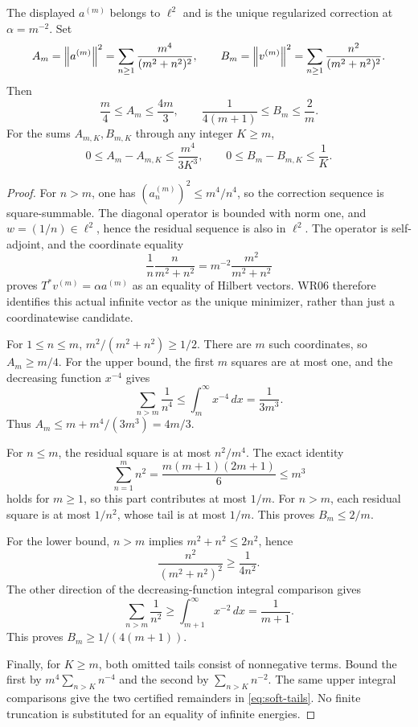 \begin{proposition}\label{WR10}
The displayed $a^{(m)}$ belongs to $\ell^2$ and is the unique regularized correction at $\alpha=m^{-2}$. Set
\[
 A_m=\left\lVert a^{(m)}\right\rVert^2=\sum_{n\ge1}\frac{m^4}{(m^2+n^2)^2},\qquad
 B_m=\left\lVert v^{(m)}\right\rVert^2=\sum_{n\ge1}\frac{n^2}{(m^2+n^2)^2}.
\]
Then
\begin{equation}\label{eq:soft-bounds}
 \frac m4\le A_m\le\frac{4m}{3},\qquad
 \frac1{4(m+1)}\le B_m\le\frac2m.
\end{equation}
For the sums $A_{m,K},B_{m,K}$ through any integer $K\ge m$,
\begin{equation}\label{eq:soft-tails}
 0\le A_m-A_{m,K}\le\frac{m^4}{3K^3},\qquad
 0\le B_m-B_{m,K}\le\frac1K.
\end{equation}
\end{proposition}
\begin{proof}
For $n>m$, one has $(a_n^{(m)})^2\le m^4/n^4$, so the correction sequence is square-summable. The diagonal operator is bounded with norm one, and $w=(1/n)\in\ell^2$, hence the residual sequence is also in $\ell^2$. The operator is self-adjoint, and the coordinate equality
\[
 \frac1n\frac{n}{m^2+n^2}
 =m^{-2}\frac{m^2}{m^2+n^2}
\]
proves $T^*v^{(m)}=\alpha a^{(m)}$ as an equality of Hilbert vectors. WR06 therefore identifies this actual infinite vector as the unique minimizer, rather than just a coordinatewise candidate.

For $1\le n\le m$, $m^2/(m^2+n^2)\ge1/2$. There are $m$ such coordinates, so $A_m\ge m/4$. For the upper bound, the first $m$ squares are at most one, and the decreasing function $x^{-4}$ gives
\[
 \sum_{n>m}\frac1{n^4}\le\int_m^\infty x^{-4}\,dx=\frac1{3m^3}.
\]
Thus $A_m\le m+m^4/(3m^3)=4m/3$.

For $n\le m$, the residual square is at most $n^2/m^4$. The exact identity
\[
 \sum_{n=1}^m n^2=\frac{m(m+1)(2m+1)}6\le m^3
\]
holds for $m\ge1$, so this part contributes at most $1/m$. For $n>m$, each residual square is at most $1/n^2$, whose tail is at most $1/m$. This proves $B_m\le2/m$.

For the lower bound, $n>m$ implies $m^2+n^2\le2n^2$, hence
\[
 \frac{n^2}{(m^2+n^2)^2}\ge\frac1{4n^2}.
\]
The other direction of the decreasing-function integral comparison gives
\[
 \sum_{n>m}\frac1{n^2}\ge\int_{m+1}^\infty x^{-2}\,dx=\frac1{m+1}.
\]
This proves $B_m\ge1/(4(m+1))$.

Finally, for $K\ge m$, both omitted tails consist of nonnegative terms. Bound the first by $m^4\sum_{n>K}n^{-4}$ and the second by $\sum_{n>K}n^{-2}$. The same upper integral comparisons give the two certified remainders in \eqref{eq:soft-tails}. No finite truncation is substituted for an equality of infinite energies.
\end{proof}

